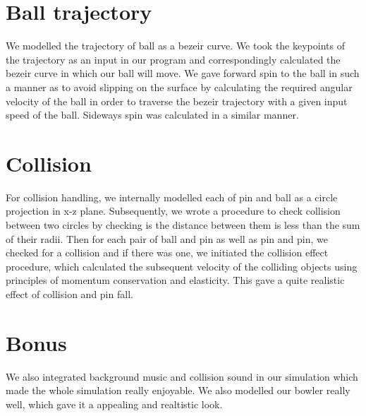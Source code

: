 \documentclass[12pt,a4paper]{article}
\begin{document}
\section{Ball trajectory}
    We modelled the trajectory of ball as a bezeir curve. We took the keypoints of the trajectory as an input in our program and correspondingly calculated the bezeir curve in which our ball will move.
    We gave forward spin to the ball in such a manner as to avoid slipping on the surface by calculating the required angular velocity of the ball in order to traverse the bezeir trajectory with a given input speed of the ball. Sideways spin was calculated in a similar manner.

\section{Collision}
    For collision handling, we internally modelled each of pin and ball as a circle projection in x-z plane. Subsequently, we wrote a procedure to check collision between two circles by checking is the distance between them is less than the sum of their radii. Then for each pair of ball and pin as well as pin and pin, we checked for a collision and if there was one, we initiated the collision effect procedure, which calculated the subsequent velocity of the colliding objects using principles of momentum conservation and elasticity. This gave a quite realistic effect of collision and pin fall.

\section{Bonus}
    We also integrated background music and collision sound in our simulation which made the whole simulation really enjoyable. We also modelled our bowler really well, which gave it a appealing and realtistic look.
    \begin{figure*}
        \begin{subfigure}[ht]{0.99\textwidth}  
            \centering 
            \texttt{[image: \{imgs/scene]}.png}
        \end{subfigure}
        \hfill
        \caption{Overview of the bowling scene}
    \end{figure*}
\end{document}
